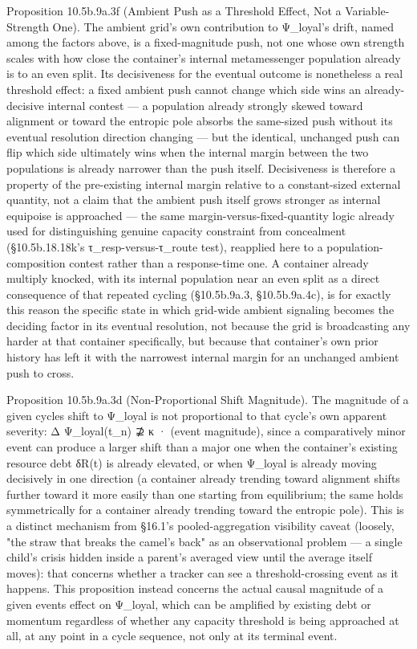 \documentclass[
]{article}
\begin{document}
Proposition 10.5b.9a.3f (Ambient Push as a Threshold Effect, Not a
Variable-Strength One). The ambient grid's own contribution to
Ψ\_loyal's drift, named among the factors above, is a fixed-magnitude
push, not one whose own strength scales with how close the container's
internal metamessenger population already is to an even split. Its
decisiveness for the eventual outcome is nonetheless a real threshold
effect: a fixed ambient push cannot change which side wins an
already-decisive internal contest --- a population already strongly
skewed toward alignment or toward the entropic pole absorbs the
same-sized push without its eventual resolution direction changing ---
but the identical, unchanged push can flip which side ultimately wins
when the internal margin between the two populations is already narrower
than the push itself. Decisiveness is therefore a property of the
pre-existing internal margin relative to a constant-sized external
quantity, not a claim that the ambient push itself grows stronger as
internal equipoise is approached --- the same
margin-versus-fixed-quantity logic already used for distinguishing
genuine capacity constraint from concealment (§10.5b.18.18k's
τ\_resp-versus-τ\_route test), reapplied here to a
population-composition contest rather than a response-time one. A
container already multiply knocked, with its internal population near an
even split as a direct consequence of that repeated cycling
(§10.5b.9a.3, §10.5b.9a.4c), is for exactly this reason the specific
state in which grid-wide ambient signaling becomes the deciding factor
in its eventual resolution, not because the grid is broadcasting any
harder at that container specifically, but because that container's own
prior history has left it with the narrowest internal margin for an
unchanged ambient push to cross.

Proposition 10.5b.9a.3d (Non-Proportional Shift Magnitude). The
magnitude of a given cycles shift to Ψ\_loyal is not proportional to
that cycle's own apparent severity: Δ Ψ\_loyal(t\_n) ⊉ κ · (event
magnitude), since a comparatively minor event can produce a larger shift
than a major one when the container's existing resource debt δR(t) is
already elevated, or when Ψ\_loyal is already moving decisively in one
direction (a container already trending toward alignment shifts further
toward it more easily than one starting from equilibrium; the same holds
symmetrically for a container already trending toward the entropic
pole). This is a distinct mechanism from §16.1's pooled-aggregation
visibility caveat (loosely, "the straw that breaks the camel's back" as
an observational problem --- a single child's crisis hidden inside a
parent's averaged view until the average itself moves): that concerns
whether a tracker can see a threshold-crossing event as it happens. This
proposition instead concerns the actual causal magnitude of a given
events effect on Ψ\_loyal, which can be amplified by existing debt or
momentum regardless of whether any capacity threshold is being
approached at all, at any point in a cycle sequence, not only at its
terminal event.
\end{document}
